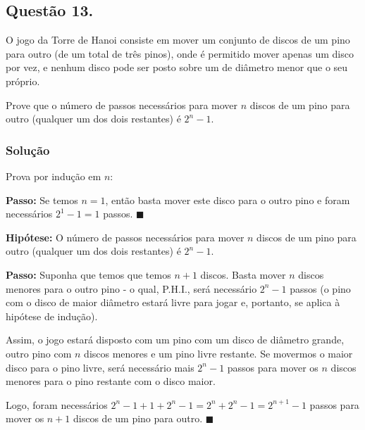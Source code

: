 \documentclass[12pt, letterpaper]{report}
\newcommand*{\CQD}{\hfill\ensuremath{\blacksquare}}%
\newcounter{ProblemNum}
\newcommand*{\anyproblem}[1]{\newpage\subsection*{#1}}
\newcommand*{\problem}[1]{\stepcounter{ProblemNum} %
   \anyproblem{Questão #1}}
\newcommand*{\soln}[1]{\subsubsection*{#1}}
\newcommand*{\solution}{\soln{Solução}}
\begin{document}
\problem{13.}
  O jogo da Torre de Hanoi consiste em mover um conjunto de discos de um pino para outro (de um total de três pinos), onde é permitido mover apenas um disco por vez, e nenhum disco pode ser posto sobre um de diâmetro menor que o seu próprio.

  Prove que o número de passos necessários para mover $ n $ discos de um pino para outro (qualquer um dos dois restantes) é $ 2^n - 1 $.

\solution
  Prova por indução em $n$:

  \textbf{Passo:} Se temos $n = 1$, então basta mover este disco para o outro pino e foram necessários $2^1 - 1 = 1$ passos. \CQD

  \textbf{Hipótese:} O número de passos necessários para mover $ n $ discos de um pino para outro (qualquer um dos dois restantes) é $ 2^n - 1 $.

  \textbf{Passo:} Suponha que temos que temos $n + 1$ discos. Basta mover $n$ discos menores para o outro pino - o qual, P.H.I., será necessário $2^n - 1$ passos (o pino com o disco de maior diâmetro estará livre para jogar e, portanto, se aplica à hipótese de indução). 

  Assim, o jogo estará disposto com um pino com um disco de diâmetro grande, outro pino com $n$ discos menores e um pino livre restante. Se movermos o maior disco para o pino livre, será necessário mais $2^n - 1$ passos para mover os $n$ discos menores para o pino restante com o disco maior.

  Logo, foram necessários $2^n - 1 + 1 + 2^n - 1 = 2^n + 2^n - 1 = 2^{n + 1} - 1$ passos para mover os $n + 1$ discos de um pino para outro. \CQD
\end{document}
